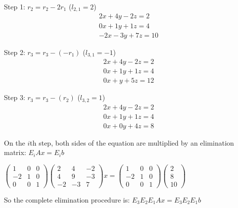 \documentclass[12pt]{article}
\begin{document}
Step 1: $r_2 = r_2 - 2r_1$ ($l_{2,1} = 2$)
\begin{align*}
2x + 4y - 2z = 2\\
0x + 1y + 1z = 4\\
-2x - 3y + 7z = 10
\end{align*}

Step 2: $r_3 = r_3 - (-r_1)$ ($l_{3,1} = -1$)
\begin{align*}
2x + 4y - 2z = 2\\
0x + 1y + 1z = 4\\
0x + y + 5z = 12
\end{align*}

Step 3: $r_3 = r_3 - (r_2)$ ($l_{3,2} = 1$)
\begin{align*}
2x + 4y - 2z = 2\\
0x + 1y + 1z = 4\\
0x + 0y + 4z = 8
\end{align*}

On the $i$th step, both sides of the equation are multiplied by an elimination matrix:
$E_i Ax = E_i b$

$
\begin{pmatrix}
1&0&0\\
-2&1&0\\
0&0&1 
\end{pmatrix}
\begin{pmatrix}
2&4&-2\\
4&9&-3\\
-2&-3&7
\end{pmatrix}
x = 
\begin{pmatrix}
1&0&0\\
-2&1&0\\
0&0&1 
\end{pmatrix}
\begin{pmatrix}
2\\
8\\
10
\end{pmatrix}
$


So the complete elimination procedure is:
$E_3 E_2 E_1 Ax = E_3 E_2 E_1 b$
\end{document}
